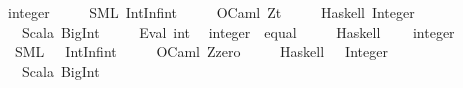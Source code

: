 \begin{isabellebody}
\isanewline
\ \ \ integer\ {\isasymrightharpoonup}\isanewline
\ \ \ \ {\isacharparenleft}{\kern0pt}SML{\isacharparenright}{\kern0pt}\ {\isachardoublequoteopen}IntInf{\isachardot}{\kern0pt}int{\isachardoublequoteclose}\isanewline
\ \ \ \ \ {\isacharparenleft}{\kern0pt}OCaml{\isacharparenright}{\kern0pt}\ {\isachardoublequoteopen}Z{\isachardot}{\kern0pt}t{\isachardoublequoteclose}\isanewline
\ \ \ \ \ {\isacharparenleft}{\kern0pt}Haskell{\isacharparenright}{\kern0pt}\ {\isachardoublequoteopen}Integer{\isachardoublequoteclose}\isanewline
\ \ \ \ \ {\isacharparenleft}{\kern0pt}Scala{\isacharparenright}{\kern0pt}\ {\isachardoublequoteopen}BigInt{\isachardoublequoteclose}\isanewline
\ \ \ \ \ {\isacharparenleft}{\kern0pt}Eval{\isacharparenright}{\kern0pt}\ {\isachardoublequoteopen}int{\isachardoublequoteclose}\isanewline
{\isacharbar}{\kern0pt}\ \ integer\ {\isacharcolon}{\kern0pt}{\isacharcolon}{\kern0pt}\ equal\ {\isasymrightharpoonup}\isanewline
\ \ \ \ {\isacharparenleft}{\kern0pt}Haskell{\isacharparenright}{\kern0pt}\ {\isacharminus}{\kern0pt}\isanewline
\isanewline
{}\isamarkupfalse%
\isanewline
\ \ \ {\isachardoublequoteopen}{}{\isacharcolon}{\kern0pt}{\isacharcolon}{\kern0pt}integer{\isachardoublequoteclose}\ {\isasymrightharpoonup}\isanewline
\ \ \ \ {\isacharparenleft}{\kern0pt}SML{\isacharparenright}{\kern0pt}\ {\isachardoublequoteopen}{\isacharbang}{\kern0pt}{\isacharparenleft}{\kern0pt}{}{\isacharslash}{\kern0pt}\ {\isacharcolon}{\kern0pt}{\isacharslash}{\kern0pt}\ IntInf{\isachardot}{\kern0pt}int{\isacharparenright}{\kern0pt}{\isachardoublequoteclose}\isanewline
\ \ \ \ \ {\isacharparenleft}{\kern0pt}OCaml{\isacharparenright}{\kern0pt}\ {\isachardoublequoteopen}Z{\isachardot}{\kern0pt}zero{\isachardoublequoteclose}\isanewline
\ \ \ \ \ {\isacharparenleft}{\kern0pt}Haskell{\isacharparenright}{\kern0pt}\ {\isachardoublequoteopen}{\isacharbang}{\kern0pt}{\isacharparenleft}{\kern0pt}{}{\isacharslash}{\kern0pt}\ {\isacharcolon}{\kern0pt}{\isacharcolon}{\kern0pt}{\isacharslash}{\kern0pt}\ Integer{\isacharparenright}{\kern0pt}{\isachardoublequoteclose}\isanewline
\ \ \ \ \ {\isacharparenleft}{\kern0pt}Scala{\isacharparenright}{\kern0pt}\ {\isachardoublequoteopen}BigInt{\isacharparenleft}{\kern0pt}{}{\isacharparenright}{\kern0pt}{\isachardoublequoteclose}\isanewline

\end{isabellebody}
